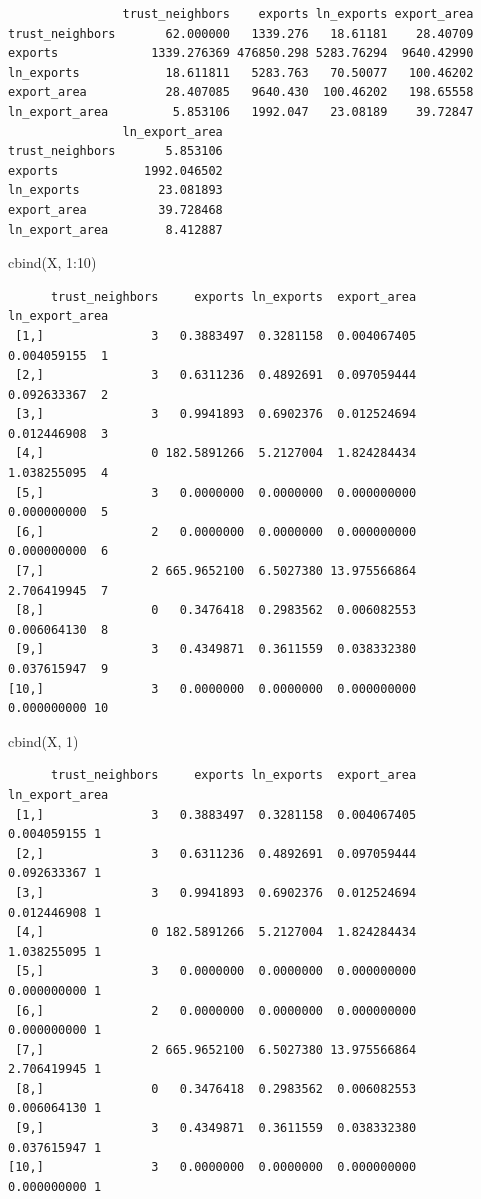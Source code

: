 \documentclass[
  letterpaper,
]{book}
\newenvironment{Shaded}{\begin{snugshade}}{\end{snugshade}}
\newcommand{\DecValTok}[1]{\textcolor[rgb]{0.68,0.00,0.00}{#1}}
\newcommand{\FunctionTok}[1]{\textcolor[rgb]{0.28,0.35,0.67}{#1}}
\newcommand{\NormalTok}[1]{\textcolor[rgb]{0.00,0.23,0.31}{#1}}
\newcommand{\SpecialCharTok}[1]{\textcolor[rgb]{0.37,0.37,0.37}{#1}}
\theoremstyle{definition}
\theoremstyle{definition}
\theoremstyle{plain}
\theoremstyle{definition}
\theoremstyle{plain}
\theoremstyle{plain}
\theoremstyle{remark}
\begin{document}
\begin{verbatim}
                trust_neighbors    exports ln_exports export_area
trust_neighbors       62.000000   1339.276   18.61181    28.40709
exports             1339.276369 476850.298 5283.76294  9640.42990
ln_exports            18.611811   5283.763   70.50077   100.46202
export_area           28.407085   9640.430  100.46202   198.65558
ln_export_area         5.853106   1992.047   23.08189    39.72847
                ln_export_area
trust_neighbors       5.853106
exports            1992.046502
ln_exports           23.081893
export_area          39.728468
ln_export_area        8.412887
\end{verbatim}

\begin{Shaded}
\begin{Highlighting}[]
\FunctionTok{cbind}\NormalTok{(X, }\DecValTok{1}\SpecialCharTok{:}\DecValTok{10}\NormalTok{)}
\end{Highlighting}
\end{Shaded}

\begin{verbatim}
      trust_neighbors     exports ln_exports  export_area ln_export_area   
 [1,]               3   0.3883497  0.3281158  0.004067405    0.004059155  1
 [2,]               3   0.6311236  0.4892691  0.097059444    0.092633367  2
 [3,]               3   0.9941893  0.6902376  0.012524694    0.012446908  3
 [4,]               0 182.5891266  5.2127004  1.824284434    1.038255095  4
 [5,]               3   0.0000000  0.0000000  0.000000000    0.000000000  5
 [6,]               2   0.0000000  0.0000000  0.000000000    0.000000000  6
 [7,]               2 665.9652100  6.5027380 13.975566864    2.706419945  7
 [8,]               0   0.3476418  0.2983562  0.006082553    0.006064130  8
 [9,]               3   0.4349871  0.3611559  0.038332380    0.037615947  9
[10,]               3   0.0000000  0.0000000  0.000000000    0.000000000 10
\end{verbatim}

\begin{Shaded}
\begin{Highlighting}[]
\FunctionTok{cbind}\NormalTok{(X, }\DecValTok{1}\NormalTok{)}
\end{Highlighting}
\end{Shaded}

\begin{verbatim}
      trust_neighbors     exports ln_exports  export_area ln_export_area  
 [1,]               3   0.3883497  0.3281158  0.004067405    0.004059155 1
 [2,]               3   0.6311236  0.4892691  0.097059444    0.092633367 1
 [3,]               3   0.9941893  0.6902376  0.012524694    0.012446908 1
 [4,]               0 182.5891266  5.2127004  1.824284434    1.038255095 1
 [5,]               3   0.0000000  0.0000000  0.000000000    0.000000000 1
 [6,]               2   0.0000000  0.0000000  0.000000000    0.000000000 1
 [7,]               2 665.9652100  6.5027380 13.975566864    2.706419945 1
 [8,]               0   0.3476418  0.2983562  0.006082553    0.006064130 1
 [9,]               3   0.4349871  0.3611559  0.038332380    0.037615947 1
[10,]               3   0.0000000  0.0000000  0.000000000    0.000000000 1
\end{verbatim}
\end{document}
